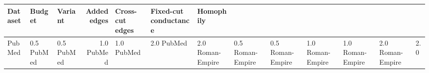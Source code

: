 \begin{tabular}{lllrlll}
\toprule
Dataset & Budget & Variant & Added edges & Cross-cut edges & Fixed-cut conductance & Homophily \\
\midrule
PubMed & 0.5%
PubMed & 0.5%
PubMed & 1.0%
PubMed & 1.0%
PubMed & 2.0%
PubMed & 2.0%
Roman-Empire & 0.5%
Roman-Empire & 0.5%
Roman-Empire & 1.0%
Roman-Empire & 1.0%
Roman-Empire & 2.0%
Roman-Empire & 2.0%
\bottomrule
\end{tabular}
